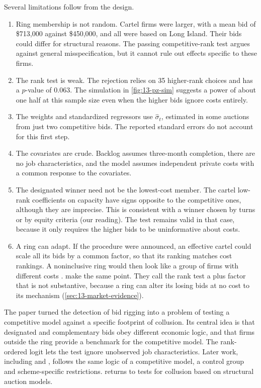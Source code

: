 Several limitations follow from the design.
\begin{enumerate}[label=(\arabic*)]
\item Ring membership is not random. Cartel firms were larger, with a mean bid of \$713,000 against \$450,000, and
all were based on Long Island. Their bids could differ for structural reasons. The passing competitive-rank test
argues against general misspecification, but it cannot rule out effects specific to these firms.
\item The rank test is weak. The rejection relies on 35 higher-rank choices and has a $p$-value of 0.063. The
simulation in \cref{fig:13-pz-sim} suggests a power of about one half at this sample size even when the higher bids
ignore costs entirely.
\item The weights and standardized regressors use $\hat\sigma_t$, estimated in some auctions from just two
competitive bids. The reported standard errors do not account for this first step.
\item The covariates are crude. Backlog assumes three-month completion, there are no job characteristics, and the
model assumes independent private costs with a common response to the covariates.
\item The designated winner need not be the lowest-cost member. The cartel low-rank coefficients on capacity have
signs opposite to the competitive ones, although they are imprecise. This is consistent with a winner chosen by
turns or by equity criteria (our reading). The test remains valid in that case, because it only requires the higher
bids to be uninformative about costs.
\item A ring can adapt. If the procedure were announced, an effective cartel could scale all its bids by a common
factor, so that its ranking matches cost rankings. A noninclusive ring would then look like a group of firms with
different costs \citep[p.~36]{PorterZona1993}. \citet[pp.~246--247]{MarshallMarx2012} make the same point. They
call the rank test a plus factor that is not substantive, because a ring can alter its losing bids at no cost to
its mechanism (\cref{sec:13-market-evidence}).
\end{enumerate}

The paper turned the detection of bid rigging into a problem of testing a competitive model against a specific
footprint of collusion. Its central idea is that designated and complementary bids obey different economic logic,
and that firms outside the ring provide a benchmark for the competitive model. The rank-ordered logit lets the
test ignore unobserved job characteristics. Later work, including \citet{PorterZona1999} and \citet{BajariYe2003},
follows the same logic of a competitive model, a control group and scheme-specific restrictions.
 returns to tests for collusion based on structural auction models.

